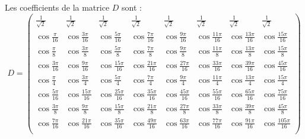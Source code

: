 \Q
Les coefficients de la matrice $D$ sont :
\[
D=\begin{pmatrix}
    \frac{1}{\sqrt2} & \frac{1}{\sqrt2} & \frac{1}{\sqrt2} & \frac{1}{\sqrt2} & \frac{1}{\sqrt2} & \frac{1}{\sqrt2} & \frac{1}{\sqrt2} & \frac{1}{\sqrt2} \\[6pt]
    \cos\frac{\pi}{16} & \cos\frac{3\pi}{16} & \cos\frac{5\pi}{16} & \cos\frac{7\pi}{16} & \cos\frac{9\pi}{16} & \cos\frac{11\pi}{16} & \cos\frac{13\pi}{16} & \cos\frac{15\pi}{16} \\[6pt]
    \cos\frac{\pi}{8} & \cos\frac{3\pi}{8} & \cos\frac{5\pi}{8} & \cos\frac{7\pi}{8} & \cos\frac{9\pi}{8} & \cos\frac{11\pi}{8} & \cos\frac{13\pi}{8} & \cos\frac{15\pi}{8} \\[6pt]
    \cos\frac{3\pi}{16} & \cos\frac{9\pi}{16} & \cos\frac{15\pi}{16} & \cos\frac{21\pi}{16} & \cos\frac{27\pi}{16} & \cos\frac{33\pi}{16} & \cos\frac{39\pi}{16} & \cos\frac{45\pi}{16} \\[6pt]
    \cos\frac{\pi}{4} & \cos\frac{3\pi}{4} & \cos\frac{5\pi}{4} & \cos\frac{7\pi}{4} & \cos\frac{9\pi}{4} & \cos\frac{11\pi}{4} & \cos\frac{13\pi}{4} & \cos\frac{15\pi}{4} \\[6pt]
    \cos\frac{5\pi}{16} & \cos\frac{15\pi}{16} & \cos\frac{25\pi}{16} & \cos\frac{35\pi}{16} & \cos\frac{45\pi}{16} & \cos\frac{55\pi}{16} & \cos\frac{65\pi}{16} & \cos\frac{75\pi}{16} \\[6pt]
    \cos\frac{3\pi}{8} & \cos\frac{9\pi}{8} & \cos\frac{15\pi}{8} & \cos\frac{21\pi}{8} & \cos\frac{27\pi}{8} & \cos\frac{33\pi}{8} & \cos\frac{39\pi}{8} & \cos\frac{45\pi}{8} \\[6pt]
    \cos\frac{7\pi}{16} & \cos\frac{21\pi}{16} & \cos\frac{35\pi}{16} & \cos\frac{49\pi}{16} & \cos\frac{63\pi}{16} & \cos\frac{77\pi}{16} & \cos\frac{91\pi}{16} & \cos\frac{105\pi}{16} \\[6pt]
\end{pmatrix}
\]

